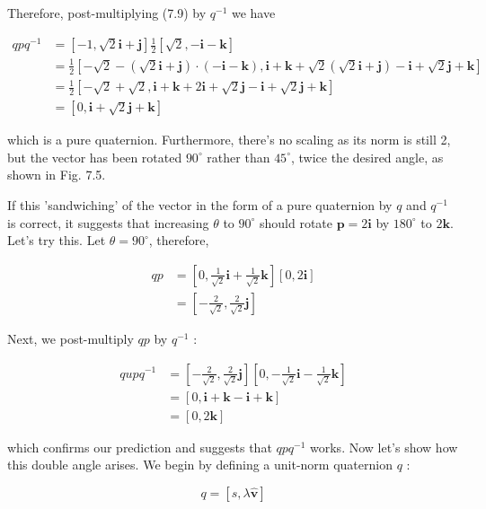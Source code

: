 Therefore, post-multiplying (7.9) by $q^{-1}$ we have

$$
\begin{aligned}
q p q^{-1} & =[-1, \sqrt{2} \mathbf{i}+\mathbf{j}] \frac{1}{2}[\sqrt{2},-\mathbf{i}-\mathbf{k}] \\
& =\frac{1}{2}[-\sqrt{2}-(\sqrt{2} \mathbf{i}+\mathbf{j}) \cdot(-\mathbf{i}-\mathbf{k}), \mathbf{i}+\mathbf{k}+\sqrt{2}(\sqrt{2} \mathbf{i}+\mathbf{j})-\mathbf{i}+\sqrt{2} \mathbf{j}+\mathbf{k}] \\
& =\frac{1}{2}[-\sqrt{2}+\sqrt{2}, \mathbf{i}+\mathbf{k}+2 \mathbf{i}+\sqrt{2} \mathbf{j}-\mathbf{i}+\sqrt{2} \mathbf{j}+\mathbf{k}] \\
& =[0, \mathbf{i}+\sqrt{2} \mathbf{j}+\mathbf{k}]
\end{aligned}
$$

which is a pure quaternion. Furthermore, there's no scaling as its norm is still 2, but the vector has been rotated $90^{\circ}$ rather than $45^{\circ}$, twice the desired angle, as shown in Fig. 7.5.

If this 'sandwiching' of the vector in the form of a pure quaternion by $q$ and $q^{-1}$ is correct, it suggests that increasing $\theta$ to $90^{\circ}$ should rotate $\mathbf{p}=2 \mathbf{i}$ by $180^{\circ}$ to $2 \mathbf{k}$. Let's try this. Let $\theta=90^{\circ}$, therefore,

$$
\begin{aligned}
q p & =\left[0, \frac{1}{\sqrt{2}} \mathbf{i}+\frac{1}{\sqrt{2}} \mathbf{k}\right][0,2 \mathbf{i}] \\
& =\left[-\frac{2}{\sqrt{2}}, \frac{2}{\sqrt{2}} \mathbf{j}\right]
\end{aligned}
$$

Next, we post-multiply $q p$ by $q^{-1}$ :

$$
\begin{aligned}
q u p q^{-1} & =\left[-\frac{2}{\sqrt{2}}, \frac{2}{\sqrt{2}} \mathbf{j}\right]\left[0,-\frac{1}{\sqrt{2}} \mathbf{i}-\frac{1}{\sqrt{2}} \mathbf{k}\right] \\
& =[0, \mathbf{i}+\mathbf{k}-\mathbf{i}+\mathbf{k}] \\
& =[0,2 \mathbf{k}]
\end{aligned}
$$

which confirms our prediction and suggests that $q p q^{-1}$ works. Now let's show how this double angle arises. We begin by defining a unit-norm quaternion $q$ :

$$
q=[s, \lambda \hat{\mathbf{v}}]
$$

